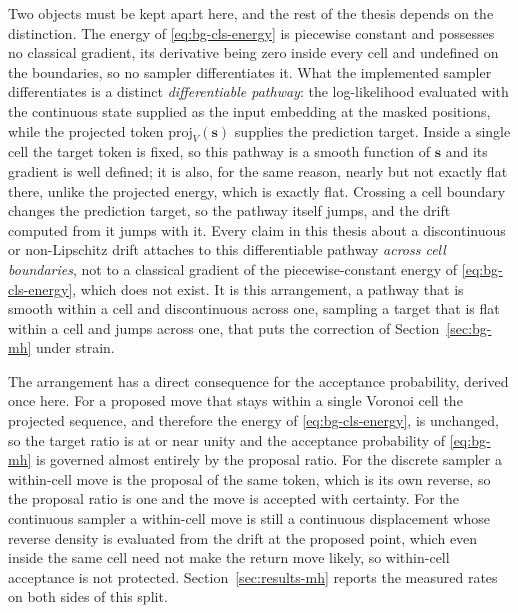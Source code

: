 Two objects must be kept apart here, and the rest of the thesis depends on the distinction. The energy of \eqref{eq:bg-cls-energy} is piecewise constant and possesses no classical gradient, its derivative being zero inside every cell and undefined on the boundaries, so no sampler differentiates it. What the implemented sampler differentiates is a distinct \emph{differentiable pathway}: the log-likelihood evaluated with the continuous state supplied as the input embedding at the masked positions, while the projected token $\mathrm{proj}_V(\bm{s})$ supplies the prediction target.
Inside a single cell the target token is fixed, so this pathway is a smooth function of $\bm{s}$ and its gradient is well defined; it is also, for the same reason, nearly but not exactly flat there, unlike the projected energy, which is exactly flat. Crossing a cell boundary changes the prediction target, so the pathway itself jumps, and the drift computed from it jumps with it. Every claim in this thesis about a discontinuous or non-Lipschitz drift attaches to this differentiable pathway \emph{across cell boundaries}, not to a classical gradient of the piecewise-constant energy of \eqref{eq:bg-cls-energy}, which does not exist. It is this arrangement, a pathway that is smooth within a cell and discontinuous across one, sampling a target that is flat within a cell and jumps across one, that puts the correction of Section~\ref{sec:bg-mh} under strain.

The arrangement has a direct consequence for the acceptance probability, derived once here. For a proposed move that stays within a single Voronoi cell the projected sequence, and therefore the energy of \eqref{eq:bg-cls-energy}, is unchanged, so the target ratio is at or near unity and the acceptance probability of \eqref{eq:bg-mh} is governed almost entirely by the proposal ratio. For the discrete sampler a within-cell move is the proposal of the same token, which is its own reverse, so the proposal ratio is one and the move is accepted with certainty. For the continuous sampler a within-cell move is still a continuous displacement whose reverse density is evaluated from the drift at the proposed point, which even inside the same cell need not make the return move likely, so within-cell acceptance is not protected. Section~\ref{sec:results-mh} reports the measured rates on both sides of this split.

